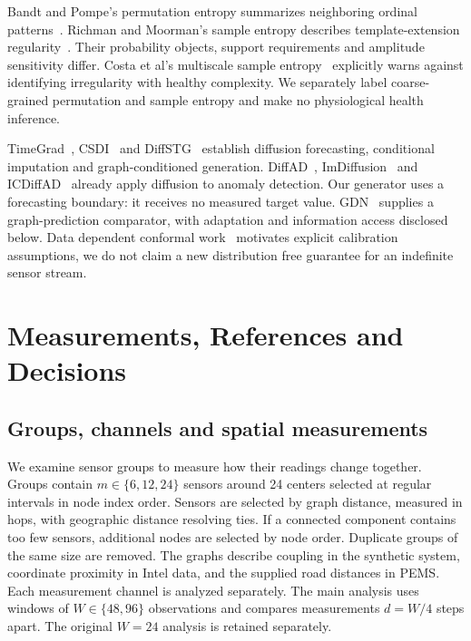 \documentclass[conference]{IEEEtran}
\begin{document}
Bandt and Pompe's permutation entropy summarizes neighboring ordinal
patterns~\cite{bandt2002}. Richman and Moorman's sample entropy describes
template-extension regularity~\cite{richman2000}. Their probability objects,
support requirements and amplitude sensitivity differ. Costa et al's
multiscale sample entropy~\cite{costa2002} explicitly warns against identifying
irregularity with healthy complexity. We separately label coarse-grained
permutation and sample entropy and make no physiological health inference.

TimeGrad~\cite{timegrad}, CSDI~\cite{csdi} and DiffSTG~\cite{diffstg} establish
diffusion forecasting, conditional imputation and graph-conditioned generation.
DiffAD~\cite{diffad}, ImDiffusion~\cite{imdiffusion} and
ICDiffAD~\cite{icdiffad} already apply diffusion to anomaly detection. Our
generator uses a forecasting boundary: it receives no measured target value.
GDN~\cite{gdn} supplies a graph-prediction comparator, with adaptation and
information access disclosed below. Data dependent conformal
work~\cite{conformal} motivates explicit calibration assumptions, we do not
claim a new distribution free guarantee for an indefinite sensor stream.




\section{Measurements, References and Decisions}



\subsection{Groups, channels and spatial measurements}
We examine sensor groups to measure how their readings change together.
Groups contain $m\in\{6,12,24\}$ sensors around 24 centers selected at
regular intervals in node index order. Sensors are selected by graph
distance, measured in hops, with geographic distance resolving ties.
If a connected component contains too few sensors, additional nodes are
selected by node order. Duplicate groups of the same size are removed.
The graphs describe coupling in the synthetic system, coordinate proximity
in Intel data, and the supplied road distances in PEMS. Each measurement
channel is analyzed separately. The main analysis uses windows of
$W\in\{48,96\}$ observations and compares measurements $d=W/4$ steps
apart. The original $W=24$ analysis is retained separately.
\end{document}
